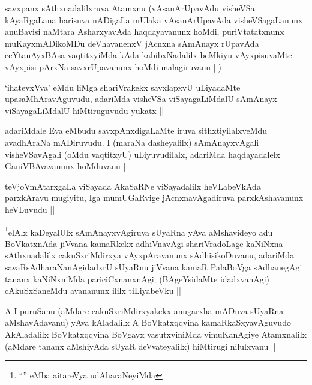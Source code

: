 \begin{artha}
savxpanx sAthxnadalilxruva Atamxnu (vAsanArUpavAdu visheVSa
kAyaRgaLana harisuva nADigaLa mUlaka vAsanArUpavAda visheVSagaLanunx
anuBavisi naMtara AsharxyavAda haqdayavanunx hoMdi, puriVtatatxnunx
muKayxmADikoMDu deVhavanenxV jAcnxna sAmAnayx rUpavAda ceYtanAyxBAsa
vaqtitxyiMda kAda kabibxNadalilx beMkiyu vAyxpisuvaMte vAyxpisi pArxNa
savxrUpavanunx hoMdi malagiruvanu ||)
\end{artha}

\begin{artha}
`ihatevxVva' eMdu liMga shariVrakekx savxlapxvU uLiyadaMte
  upasaMhAravAguvudu, adariMda visheVSa viSayagaLiMdalU sAmAnayx
  viSayagaLiMdalU hiMtiruguvudu yukatx ||
\end{artha}


\begin{artha}
adariMdale Eva eMbudu savxpAnxdigaLaMte iruva sithxtiyilalxveMdu
avadhAraNa mADiruvudu. I (maraNa dasheyalilx) sAmAnayxvAgali
visheVSavAgali (oMdu vaqtitxyU) uLiyuvudilalx, adariMda haqdayadalelx
GaniVBAvavanunx hoMduvanu ||
\end{artha}


\begin{artha}
teVjoVmAtarxgaLa viSayada AkaSaRNe viSayadalilx heVLabeVkAda
parxkAravu mugiyitu, Iga mumUGaRvige jAcnxnavAgadiruva parxkAshavanunx
heVLuvudu ||
\end{artha}


\begin{artha}
\footnote{``\stext'' eMba aitareVya udAharaNeyiMda}elAlx kaDeyalUlx sAmAnayxvAgiruva sUyaRna yAva aMshavideyo
adu BoVkatxnAda jiVvana kamaRkekx adhiVnavAgi shariVradoLage kaNiNxna
sAthxnadalilx cakuSxriMdirxya vAyxpAravanunx sAdhisikoDuvanu, adariMda
savaRsAdharaNanAgidadxrU sUyaRnu jiVvana kamaR PalaBoVga sAdhanegAgi
tananx kaNiNxniMda pariciCxnanxnAgi; (BAgeYsidaMte idadxvanAgi)
cAkuSxSaneMdu avananunx ililx tiLiyabeVku ||
\end{artha}


\begin{artha}
A I puruSanu (aMdare cakuSxriMdirxyakekx anugarxha mADuva sUyaRna aMshavAdavanu)
yAva kAladalilx A BoVkatxqqvina kamaRkaSxyavAguvudo
AkAladalilx BoVkatxqqvina BoVgayx vasutxviniMda vimuKanAgiye
Atamxnalilx (aMdare tananx aMshiyAda sUyaR deVvateyalilx) hiMtirugi
nilulxvanu ||
\end{artha}

